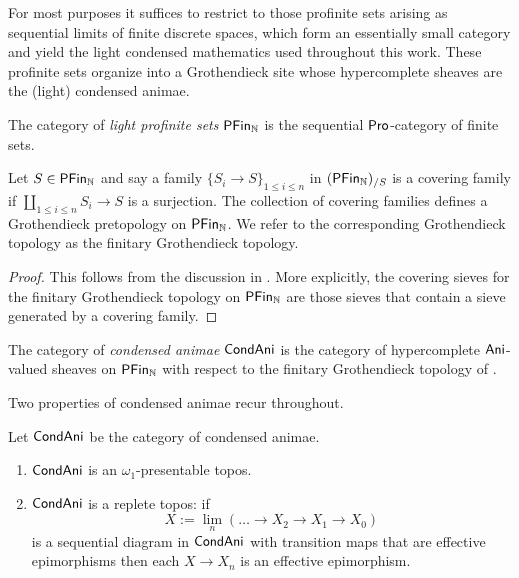 For most purposes it suffices to restrict to those profinite sets arising as sequential limits of finite discrete spaces, which form an essentially small category and yield the light condensed mathematics used throughout this work. These profinite sets organize into a Grothendieck site whose hypercomplete sheaves are the (light) condensed animae. 
\begin{definition}\label{def: light profinite sets}
    The category of \emph{light profinite sets} $\mathsf{PFin}_{\mathbb{N}}$ is the sequential $\mathsf{Pro}$-category of finite sets. 
\end{definition}
\begin{lemma}\label{lem: Grothendieck topology on light profinite sets}
    Let $S\in\mathsf{PFin}_{\mathbb{N}}$ and say a family $\{S_{i}\to S\}_{1\leq i\leq n}$ in $(\mathsf{PFin}_{\mathbb{N}})_{/S}$ is a covering family if $\coprod_{1\leq i\leq n}S_{i}\to S$ is a surjection. The collection of covering families defines a Grothendieck pretopology on $\mathsf{PFin}_{\mathbb{N}}$. We refer to the corresponding Grothendieck topology as the finitary Grothendieck topology. 
\end{lemma}
\begin{proof}
    This follows from the discussion in \cite[\S 2.2]{CamargoSolid}. More explicitly, the covering sieves for the finitary Grothendieck topology on $\mathsf{PFin}_{\mathbb{N}}$ are those sieves that contain a sieve generated by a covering family. 
\end{proof}
\begin{definition}\label{def: condensed animae}
    The category of \emph{condensed animae} $\mathsf{Cond}\mathsf{Ani}$ is the category of hypercomplete $\mathsf{Ani}$-valued sheaves on $\mathsf{PFin}_{\mathbb{N}}$ with respect to the finitary Grothendieck topology of . 
\end{definition}
Two properties of condensed animae recur throughout. 
\begin{proposition}\label{prop: properties of condensed animae}
    Let $\mathsf{Cond}\mathsf{Ani}$ be the category of condensed animae. 
    \begin{enumerate}
        \item $\mathsf{Cond}\mathsf{Ani}$ is an $\omega_{1}$-presentable topos. 
        \item $\mathsf{Cond}\mathsf{Ani}$ is a replete topos: if 
        $$X:=\lim_{n}\left(\dots\to X_{2}\to X_{1}\to X_{0}\right)$$
        is a sequential diagram in $\mathsf{Cond}\mathsf{Ani}$ with transition maps that are effective epimorphisms then each $X\to X_{n}$ is an effective epimorphism. 
    \end{enumerate}
\end{proposition}
